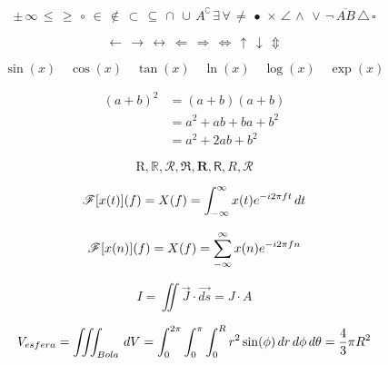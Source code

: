 \begin{equation*}
\pm \, \infty \, \leq \, \geq \, \circ \, \in \, \notin \, \subset \, \subseteq \, \cap \, \cup \, A^\complement \, \exists \, \forall \, \neq \, \bullet  \, \times \, \angle \, \land \, \lor \, \neg \, \overline{AB} \, \triangle \, \square
\end{equation*}

\begin{equation*}
\leftarrow \, \rightarrow \, \leftrightarrow \, \Leftarrow \, \Rightarrow \, \Leftrightarrow \, \uparrow \, \downarrow \, \Updownarrow
\end{equation*}

\begin{equation*}
	\sin(x) \quad \cos(x) \quad \tan(x) \quad \ln(x) \quad \log(x) \quad \exp(x)
\end{equation*}

\begin{align*}
	(a+b)^2 &= (a+b)(a+b)\\
	&= a^2+ab+ba+b^2\\
	&=a^2+2ab+b^2
\end{align*}

\begin{equation*}
    \mathrm{R}, \mathbb{R}, \mathcal{R}, \mathfrak{R}, \mathbf{R}, \mathsf{R}, \mathit{R}, \mathscr{R}
\end{equation*}

\begin{equation*}
\mathscr{F}[x(t)](f)=X(f)=\int_{-\infty}^{\infty} x(t) e^{-i 2\pi f t}\, dt
\end{equation*}

\begin{equation*}
\mathscr{F}[x(n)](f)=X(f)=\sum_{-\infty}^{\infty} x(n) e^{-i 2\pi f n}
\end{equation*}

\begin{equation*}
I = \iint{\overrightarrow{J}\cdot\overrightarrow{ds}}=J\cdot A
\end{equation*}

\begin{equation*}
V_{esfera} = \iiint_{Bola}\,dV = \int_{0}^{2\pi}\int_{0}^{\pi}\int_{0}^{R}{r^2\sin(\phi)}\,dr\,d\phi\,d\theta=\frac{4}{3}\pi R^2
\end{equation*}


